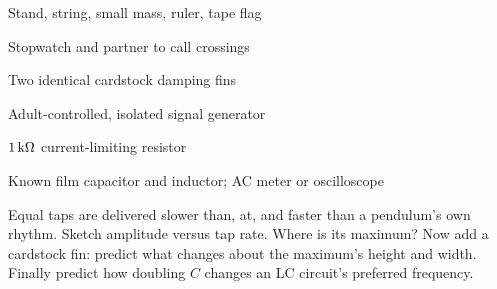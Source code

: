 



\begin{materials}
\item Stand, string, small mass, ruler, tape flag
\item Stopwatch and partner to call crossings
\item Two identical cardstock damping fins
\item Adult-controlled, isolated signal generator
\item \(1\,\mathrm{k\Omega}\) current-limiting resistor
\item Known film capacitor and inductor; AC meter or oscilloscope
\end{materials}

\begin{predict}
Equal taps are delivered slower than, at, and faster than a pendulum's own
rhythm. Sketch amplitude versus tap rate. Where is its maximum? Now add a
cardstock fin: predict what changes about the maximum's height and width.
Finally predict how doubling \(C\) changes an LC circuit's preferred frequency.
\end{predict}


